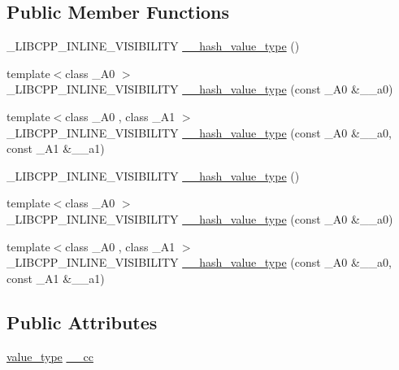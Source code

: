 \subsection*{Public Member Functions}
\begin{DoxyCompactItemize}
\item 
\+\_\+\+L\+I\+B\+C\+P\+P\+\_\+\+I\+N\+L\+I\+N\+E\+\_\+\+V\+I\+S\+I\+B\+I\+L\+I\+T\+Y \hyperlink{struct____hash__value__type_a0ebe048baf8f52f962fb88ac7f7278ca}{\+\_\+\+\_\+hash\+\_\+value\+\_\+type} ()
\item 
{\footnotesize template$<$class \+\_\+\+A0 $>$ }\\\+\_\+\+L\+I\+B\+C\+P\+P\+\_\+\+I\+N\+L\+I\+N\+E\+\_\+\+V\+I\+S\+I\+B\+I\+L\+I\+T\+Y \hyperlink{struct____hash__value__type_a6e99bfad7ba7a20dabb3d370b3c6ccdc}{\+\_\+\+\_\+hash\+\_\+value\+\_\+type} (const \+\_\+\+A0 \&\+\_\+\+\_\+a0)
\item 
{\footnotesize template$<$class \+\_\+\+A0 , class \+\_\+\+A1 $>$ }\\\+\_\+\+L\+I\+B\+C\+P\+P\+\_\+\+I\+N\+L\+I\+N\+E\+\_\+\+V\+I\+S\+I\+B\+I\+L\+I\+T\+Y \hyperlink{struct____hash__value__type_af6eb3d9b11413d261cd2d5a179f5b6df}{\+\_\+\+\_\+hash\+\_\+value\+\_\+type} (const \+\_\+\+A0 \&\+\_\+\+\_\+a0, const \+\_\+\+A1 \&\+\_\+\+\_\+a1)
\item 
\+\_\+\+L\+I\+B\+C\+P\+P\+\_\+\+I\+N\+L\+I\+N\+E\+\_\+\+V\+I\+S\+I\+B\+I\+L\+I\+T\+Y \hyperlink{struct____hash__value__type_a0ebe048baf8f52f962fb88ac7f7278ca}{\+\_\+\+\_\+hash\+\_\+value\+\_\+type} ()
\item 
{\footnotesize template$<$class \+\_\+\+A0 $>$ }\\\+\_\+\+L\+I\+B\+C\+P\+P\+\_\+\+I\+N\+L\+I\+N\+E\+\_\+\+V\+I\+S\+I\+B\+I\+L\+I\+T\+Y \hyperlink{struct____hash__value__type_a6e99bfad7ba7a20dabb3d370b3c6ccdc}{\+\_\+\+\_\+hash\+\_\+value\+\_\+type} (const \+\_\+\+A0 \&\+\_\+\+\_\+a0)
\item 
{\footnotesize template$<$class \+\_\+\+A0 , class \+\_\+\+A1 $>$ }\\\+\_\+\+L\+I\+B\+C\+P\+P\+\_\+\+I\+N\+L\+I\+N\+E\+\_\+\+V\+I\+S\+I\+B\+I\+L\+I\+T\+Y \hyperlink{struct____hash__value__type_af6eb3d9b11413d261cd2d5a179f5b6df}{\+\_\+\+\_\+hash\+\_\+value\+\_\+type} (const \+\_\+\+A0 \&\+\_\+\+\_\+a0, const \+\_\+\+A1 \&\+\_\+\+\_\+a1)
\end{DoxyCompactItemize}
\subsection*{Public Attributes}
\begin{DoxyCompactItemize}
\item 
\hyperlink{struct____hash__value__type_ac11e71883806eb3d03807b7f284b4a70}{value\+\_\+type} \hyperlink{struct____hash__value__type_a2ff75e4d342d8e69cdd20e052a87a292}{\+\_\+\+\_\+cc}
\end{DoxyCompactItemize}


